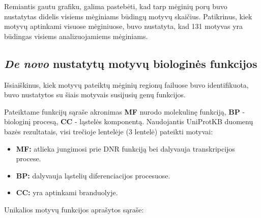 \documentclass[12pt]{article}
\begin{document}
Remiantis gautu grafiku, galima pastebėti, kad tarp mėginių porų
buvo nustatytas didelis visiems mėginiams būdingų motyvų skaičius.
Patikrinus, kiek motyvų aptinkami visuose mėginiuose, buvo nustatyta,
kad 131 motyvas yra būdingas visiems analizuojamiems mėginiams.

\subsection{\emph{De novo} nustatytų motyvų biologinės funkcijos}
Išsiaiškinus, kiek motyvų pateiktų mėginių regionų failuose buvo
identifikuota, buvo nustatytos su šiais motyvais susijusių genų
funkcijos.

Pateiktame funkcijų sąraše akronimas \textbf{MF} nurodo molekulinę
funkciją, \textbf{BP} - biologinį procesą, \textbf{CC} - ląstelės
komponentą. Naudojantis UniProtKB\cite{UNIPROTKB} duomenų bazės rezultatais,
visi trečioje lentelėje (3 lentelė) pateikti motyvai:

\begin{itemize}
    \item \textbf{MF:} atlieka jungimosi prie DNR funkciją bei
    dalyvauja transkripcijos procese.
    \item \textbf{BP:} dalyvauja ląstelių diferenciacijos
    procesuose.
    \item \textbf{CC:} yra aptinkami branduolyje.
\end{itemize}

\newpage

Unikalios motyvų funkcijos aprašytos sąraše:
\end{document}
